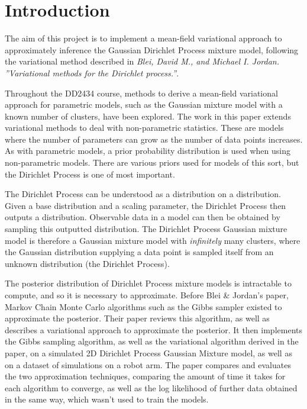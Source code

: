 \documentclass{article}
\begin{document}
\thispagestyle{empty}

\newpage

\section{Introduction}

The aim of this project is to implement a mean-field variational approach to approximately inference the Gaussian Dirichlet Process mixture model, following the variational method described in \emph{Blei, David M., and Michael I. Jordan. ”Variational methods for the Dirichlet process.”}.

Throughout the DD2434 course, methods to derive a mean-field variational approach for parametric models, such as the Gaussian mixture model with a known number of clusters, have been explored. The work in this paper extends variational methods to deal with non-parametric statistics. These are models where the number of parameters can grow as the number of data points increases. As with parametric models, a prior probability distribution is used when using non-parametric models. There are various priors used for models of this sort, but the Dirichlet Process is one of most important.

The Dirichlet Process can be understood as a distribution on a distribution. Given a base distribution and a scaling parameter, the Dirichlet Process then outputs a distribution. Observable data in a model can then be obtained by sampling this outputted distribution. The Dirichlet Process Gaussian mixture model is therefore a Gaussian mixture model with \emph{infinitely} many clusters, where the Gaussian distribution supplying a data point is sampled itself from an unknown distribution (the Dirichlet Process).

The posterior distribution of Dirichlet Process mixture models is intractable to compute, and so it is necessary to approximate. Before Blei \& Jordan's paper, Markov Chain Monte Carlo algorithms such as the Gibbs sampler existed to approximate the posterior. Their paper reviews this algorithm, as well as describes a variational approach to approximate the posterior. It then implements the Gibbs sampling algorithm, as well as the variational algorithm derived in the paper, on a simulated 2D Dirichlet Process Gaussian Mixture model, as well as on a dataset of simulations on a robot arm. The paper compares and evaluates the two approximation techniques, comparing the amount of time it takes for each algorithm to converge, as well as the log likelihood of further data obtained in the same way, which wasn't used to train the models.
\end{document}

